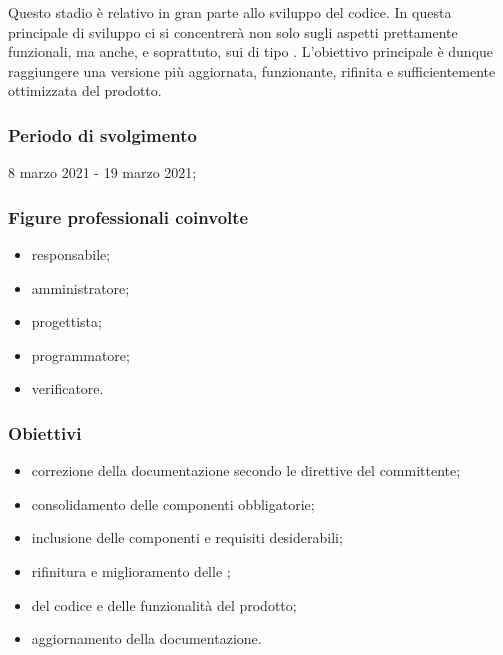 Questo stadio è relativo in gran parte allo sviluppo del codice. In questa  principale di sviluppo ci si concentrerà non solo sugli aspetti prettamente funzionali, ma anche, e soprattuto, sui  di tipo . L'obiettivo principale è dunque raggiungere una versione più aggiornata, funzionante, rifinita e sufficientemente ottimizzata del prodotto.
        
        \subsubsection{Periodo di svolgimento}
        8 marzo 2021 - 19 marzo 2021;
        
        \subsubsection{Figure professionali coinvolte}
            \begin{itemize}
                \item responsabile;
                \item amministratore;
                \item progettista;
                \item programmatore;
                \item verificatore.
            \end{itemize}

        \subsubsection{Obiettivi}
        \begin{itemize}
            \item correzione della documentazione secondo le direttive del committente;
            \item consolidamento delle componenti obbligatorie;
            \item inclusione delle componenti e requisiti desiderabili;
            \item rifinitura e miglioramento delle ;
            \item {} del codice e delle funzionalità del prodotto;
            \item aggiornamento della documentazione.
        \end{itemize}